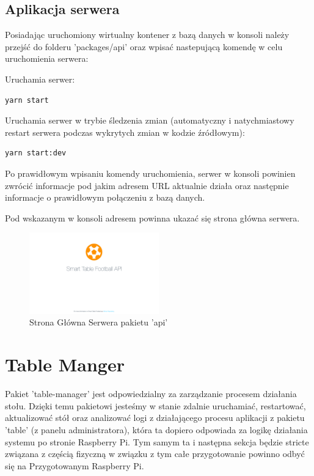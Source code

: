 \subsection{Aplikacja serwera}

Posiadając uruchomiony wirtualny kontener z bazą danych w konsoli należy przejść do folderu 'packages/api' oraz wpisać nastepującą komendę w celu uruchomienia serwera:

Uruchamia serwer:
\begin{lstlisting}
yarn start
\end{lstlisting}

Uruchamia serwer w trybie śledzenia zmian (automatyczny i natychmiastowy restart serwera podczas wykrytych zmian w kodzie źródłowym):
\begin{lstlisting}
yarn start:dev
\end{lstlisting}

Po prawidłowym wpisaniu komendy uruchomienia, serwer w konsoli powinien zwrócić informacje pod jakim adresem URL aktualnie działa oraz następnie informacje o prawidłowym połączeniu z bazą danych.


Pod wskazanym w konsoli adresem powinna ukazać się strona główna serwera.

\begin{figure}[h!]
  \centering
    \includegraphics[width=0.5\textwidth]{images/api/stf_api_home.png}
  \caption{Strona Główna Serwera pakietu 'api'}
  \label{fig:mobile}
\end{figure}


\section{Table Manger}
Pakiet 'table-manager' jest odpowiedzialny za zarządzanie procesem działania stołu. Dzięki temu pakietowi jesteśmy w stanie zdalnie uruchamiać, restartować, aktualizować stół oraz analizować logi z działającego procesu aplikacji z pakietu 'table' (z panelu administratora), która ta dopiero odpowiada za logikę działania systemu po stronie Raspberry Pi. Tym samym ta i następna sekcja będzie stricte związana z częścią fizyczną w związku z tym całe przygotowanie powinno odbyć się na Przygotowanym Raspberry Pi.


